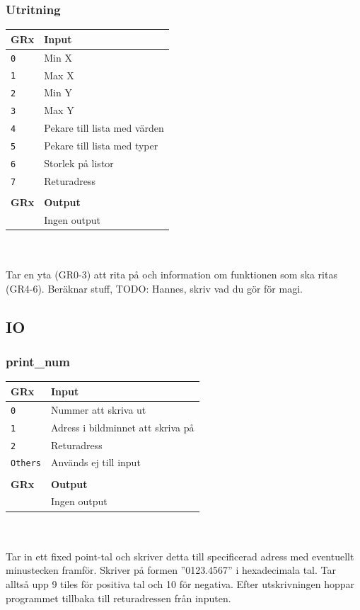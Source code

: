 \documentclass[]{article}
\begin{document}
\subsubsection{Utritning}
\begin{tabular}{ll}
	\textbf{GRx} & \textbf{Input}               \\ \hline
	\texttt{0}   & Min X                        \\
	\texttt{1}   & Max X                        \\
	\texttt{2}   & Min Y                        \\
	\texttt{3}   & Max Y                        \\
	\texttt{4}   & Pekare till lista med värden \\
	\texttt{5}   & Pekare till lista med typer  \\
	\texttt{6}   & Storlek på listor            \\
	\texttt{7}   & Returadress                  \\
	             &  \\
	\textbf{GRx} & \textbf{Output}              \\ \hline
	             & Ingen output
\end{tabular}
\\\\
\noindent
Tar en yta (GR0-3) att rita på och information om funktionen som ska ritas (GR4-6). Beräknar stuff, TODO: Hannes, skriv vad du gör för magi. 

\subsection{IO}
\subsubsection{print\_num}
\begin{tabular}{ll}
	\textbf{GRx}    & \textbf{Input}                    \\ \hline
	\texttt{0}      & Nummer att skriva ut              \\
	\texttt{1}      & Adress i bildminnet att skriva på \\
	\texttt{2}      & Returadress                       \\
	\texttt{Others} & Används ej till input             \\
	                &  \\
	\textbf{GRx}    & \textbf{Output}                   \\ \hline
	                & Ingen output 						\\
\end{tabular}
\\\\
\noindent
Tar in ett fixed point-tal och skriver detta till specificerad adress med eventuellt minustecken framför. Skriver på formen ''0123.4567'' i hexadecimala tal. Tar alltså upp 9 tiles för positiva tal och 10 för negativa. Efter utskrivningen hoppar programmet tillbaka till returadressen från inputen.
\end{document}
